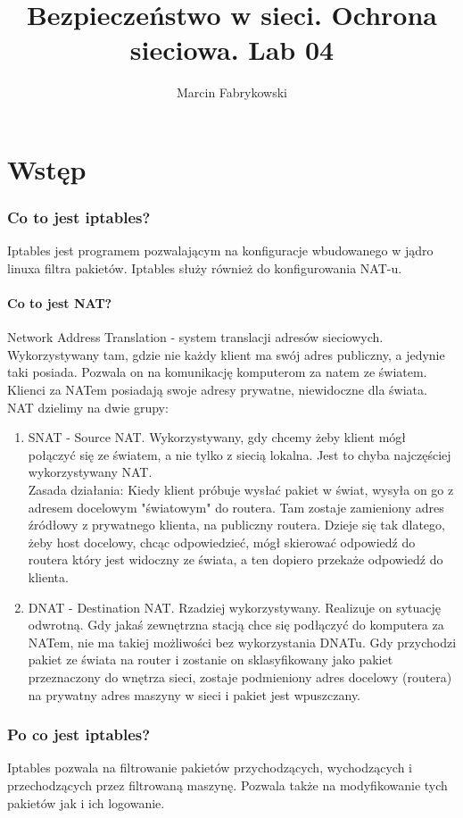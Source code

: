 \documentclass[a4paper,12pt]{article}
\author{Marcin Fabrykowski}
\title{Bezpieczeństwo w sieci. Ochrona sieciowa. Lab 04}
\begin{document}
\maketitle
\newpage
\part{Wstęp}
\section{Co to jest iptables?}
Iptables jest programem pozwalającym na konfiguracje wbudowanego w jądro linuxa filtra pakietów. Iptables służy również do konfigurowania NAT-u.
\subsection{Co to jest NAT?}
Network Address Translation - system translacji adresów sieciowych. Wykorzystywany tam, gdzie nie każdy klient ma swój adres publiczny, a jedynie taki posiada. Pozwala on na komunikację komputerom za natem ze światem. Klienci za NATem posiadają swoje adresy prywatne, niewidoczne dla świata.\\
NAT dzielimy na dwie grupy:
\begin{enumerate}
\item SNAT - Source NAT. Wykorzystywany, gdy chcemy żeby klient mógł połączyć się ze światem, a nie tylko z siecią lokalna. Jest to chyba najczęściej wykorzystywany NAT.\\
Zasada działania: Kiedy klient próbuje wysłać pakiet w świat, wysyła on go z adresem docelowym "światowym" do routera. Tam zostaje zamieniony adres źródłowy z prywatnego klienta, na publiczny routera.
Dzieje się tak dlatego, żeby host docelowy, chcąc odpowiedzieć, mógł skierować odpowiedź do routera który jest widoczny ze świata, a ten dopiero przekaże odpowiedź do klienta. 
\item DNAT - Destination NAT. Rzadziej wykorzystywany. Realizuje on sytuację odwrotną. Gdy jakaś zewnętrzna stacją chce się podłączyć do komputera za NATem, nie ma takiej możliwości bez wykorzystania DNATu. Gdy przychodzi pakiet ze świata na router i zostanie on sklasyfikowany jako pakiet przeznaczony do wnętrza sieci, zostaje podmieniony adres docelowy (routera) na prywatny adres maszyny w sieci i pakiet jest wpuszczany.
\end{enumerate}
\section{Po co jest iptables?}
Iptables pozwala na filtrowanie pakietów przychodzących, wychodzących i przechodzących przez filtrowaną maszynę. Pozwala także na modyfikowanie tych pakietów jak i ich logowanie.
\end{document}
